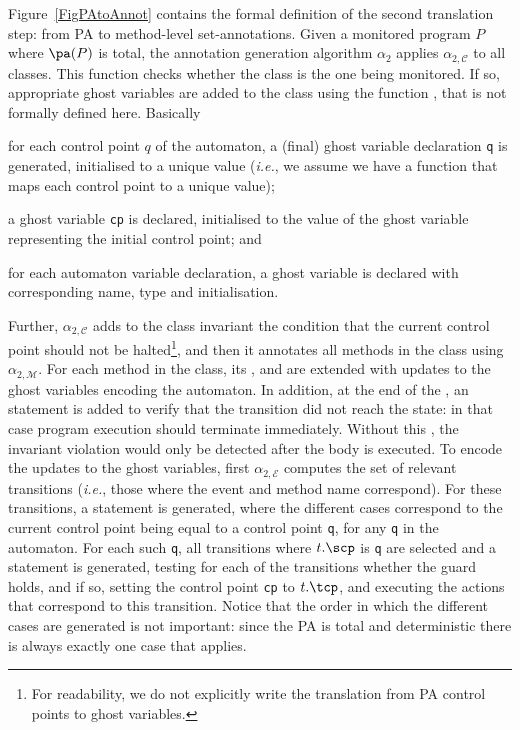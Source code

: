 Figure~\ref{FigPAtoAnnot} contains the formal definition of the
second translation step: from PA to method-level set-annotations.
Given a monitored program \(P\) where \(\pa(P)\) is total,
the annotation generation algorithm \(\alpha_2\) applies
\(\alpha_{2, \mathcal{C}}\) to all classes.
This function checks whether the class is the one being
monitored. If so, appropriate ghost variables are added to the class
using the function \newgvs, that is not formally defined here. Basically
\begin{inparaenum}
\item for each control point \(q\) of the automaton, a (final) ghost
variable declaration \texttt{q} is generated, initialised to a unique value
(\emph{i.e.}, we assume we have a function \unique that maps each
control point to a unique value);
\item a ghost variable \texttt{cp} is declared, initialised to the
value of the ghost variable representing the initial control point; and
\item for each automaton variable declaration, a ghost variable is
declared with corresponding name, type and initialisation.
\end{inparaenum}
Further, \(\alpha_{2, \mathcal{C}}\) adds to the class invariant
the condition that the current control point should not be
halted\footnote{For readability, we do not explicitly write the
translation from PA control points to ghost variables.}, and then it
annotates all methods in the class using \(\alpha_{2,
\mathcal{M}}\). For each method in the class, its \preset, \postset
and \excset are extended with updates to the ghost variables encoding
the automaton. In addition, at the end of the \preset, an \Assert
statement is added to verify that the transition did not reach the
\halted state: in that case program execution should terminate
immediately.  Without this \Assert, the invariant violation would only
be detected after the body is executed. To encode the updates to the
ghost variables, first \(\alpha_{2, \mathcal{E}}\) computes the set of
relevant transitions (\emph{i.e.}, those where the event and method
name correspond). For these transitions, a \CaseJML statement is
generated, where the different cases correspond to the current control
point being equal to a control point \texttt{q}, for any
\texttt{q} in the automaton. For each such \texttt{q}, all transitions
where \(t.\scp\) is \texttt{q} are selected and a \CaseJML
statement is generated, testing for each of the transitions whether
the guard holds, and if so, setting the control point \texttt{cp} to
\(t.\tcp\), and executing the actions that correspond to this
transition.
Notice that the order in which the different cases are generated is
not important: since the PA is total and deterministic there is
always exactly one case that applies.


